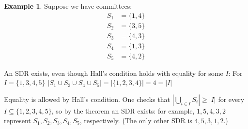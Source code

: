 \documentclass{article}
\theoremstyle{definition}
\newtheorem{example}{Example}
\begin{document}
\pagebreak
\newpage
\clearpage

\begin{example}
Suppose we have committees:
\begin{align*}
S_1 &= \{1,4\} \\
S_2 &= \{3,5\} \\
S_3 &= \{4,3\} \\
S_4 &= \{1,3\} \\
S_5 &= \{4,2\}
\end{align*}

An SDR exists, even though Hall's condition holds with equality for some $I$:
For $I = \{1,3,4,5\}$
$|S_1\cup S_3\cup S_4\cup S_5| = |\{1,2,3,4\}| = 4 = |I|$

Equality is allowed by Hall's condition. One checks that $\left|\bigcup_{i\in I} S_i\right| \geq |I|$ for every $I \subseteq \{1,2,3,4,5\}$, so by the theorem an SDR exists: for example, $1, 5, 4, 3, 2$ represent $S_1, S_2, S_3, S_4, S_5$, respectively. (The only other SDR is $4, 5, 3, 1, 2$.)
\end{example}
\end{document}
